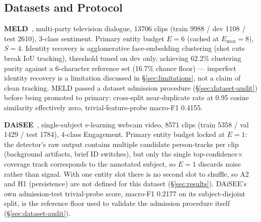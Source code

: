 \label{sec:pre-registration}

\subsection{Datasets and Protocol}
\textbf{MELD}~\cite{poria2019meld}, multi-party television dialogue,
13706 clips (train 9988 / dev 1108 / test 2610), 3-class sentiment. Primary
entity budget $E{=}6$ (cached at $E_{\max}{=}8$), $S{=}4$. Identity recovery
is agglomerative face-embedding clustering (shot cuts break IoU tracking),
threshold tuned on dev only, achieving
62.2\% clustering purity against a 6-character reference set (16.7\% chance
floor) --- imperfect identity recovery is a limitation discussed in
\S\ref{sec:limitations}, not a claim of clean tracking. MELD passed a dataset
admission procedure (\S\ref{sec:dataset-audit}) before being promoted to
primary: cross-split near-duplicate rate at 0.95 cosine similarity effectively
zero, trivial-feature-probe macro-F1
0.4155.

\textbf{DAiSEE}~\cite{gupta2016daisee}, single-subject e-learning webcam
video,
8571 clips (train 5358 / val 1429 / test 1784), 4-class Engagement. Primary
entity budget locked at $E{=}1$: the detector's raw output contains multiple
candidate person-tracks per clip (background artifacts, brief ID switches),
but only the single top-confidence$\times$coverage track corresponds to the
annotated subject, so $E{=}1$ discards noise rather than signal. With one
entity slot there is no second slot to shuffle, so A2 and H1 (persistence)
are not defined for this dataset (\S\ref{sec:results}). DAiSEE's own
admission-test trivial-probe score,
macro-F1 0.2177 on its subject-disjoint split, is the reference floor used to
validate the admission procedure itself (\S\ref{sec:dataset-audit}).

